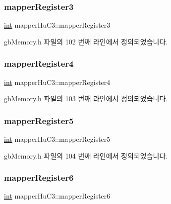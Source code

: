 \subsubsection{\texorpdfstring{mapper\+Register3}{mapperRegister3}}
{\footnotesize\ttfamily \mbox{\hyperlink{_util_8cpp_a0ef32aa8672df19503a49fab2d0c8071}{int}} mapper\+Hu\+C3\+::mapper\+Register3}



gb\+Memory.\+h 파일의 102 번째 라인에서 정의되었습니다.

\mbox{\label{structmapper_hu_c3_abbd3e6768218879289e081bfe61085a0}} 
\subsubsection{\texorpdfstring{mapper\+Register4}{mapperRegister4}}
{\footnotesize\ttfamily \mbox{\hyperlink{_util_8cpp_a0ef32aa8672df19503a49fab2d0c8071}{int}} mapper\+Hu\+C3\+::mapper\+Register4}



gb\+Memory.\+h 파일의 103 번째 라인에서 정의되었습니다.

\mbox{\label{structmapper_hu_c3_ad72bed2f2b497e68ff30c70f8105c03a}} 
\subsubsection{\texorpdfstring{mapper\+Register5}{mapperRegister5}}
{\footnotesize\ttfamily \mbox{\hyperlink{_util_8cpp_a0ef32aa8672df19503a49fab2d0c8071}{int}} mapper\+Hu\+C3\+::mapper\+Register5}



gb\+Memory.\+h 파일의 104 번째 라인에서 정의되었습니다.

\mbox{\label{structmapper_hu_c3_a5dace14f152956810d188d6b08ca0739}} 
\subsubsection{\texorpdfstring{mapper\+Register6}{mapperRegister6}}
{\footnotesize\ttfamily \mbox{\hyperlink{_util_8cpp_a0ef32aa8672df19503a49fab2d0c8071}{int}} mapper\+Hu\+C3\+::mapper\+Register6}



